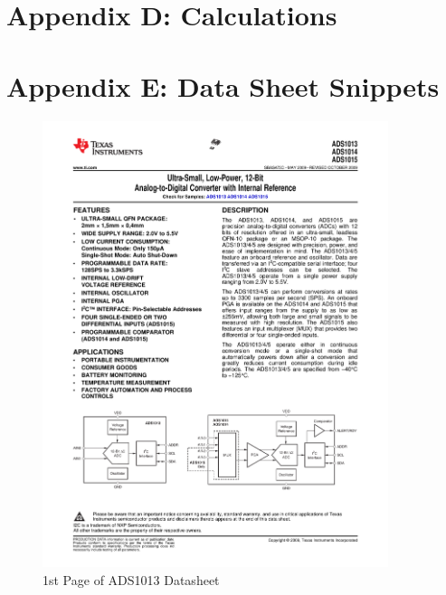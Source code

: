 \documentclass{article}
\begin{document}
{\newpage
\section*{Appendix D: Calculations}

\newpage
\section*{Appendix E: Data Sheet Snippets}
\begin{figure}[H]
	\centering
	\includegraphics[page=1,width=0.9\textwidth]{combined.pdf}
	\caption{1st Page of ADS1013 Datasheet}
	\label{fig:adsdat}
\end{figure}
\newpage
\begin{figure}[H]
	\centering

\end{figure}}
\end{document}
